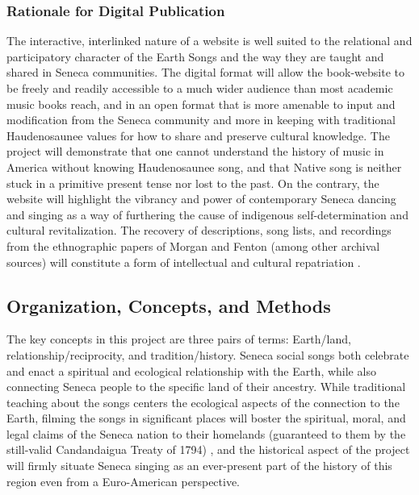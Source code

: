 \documentclass{neh}
\begin{document}
\subsubsection{Rationale for Digital Publication}

The interactive, interlinked nature of a website is well suited to the
relational and participatory character of the Earth Songs and the way they are
taught and shared in Seneca communities.
The digital format will allow the book-website to be freely and readily
accessible to a much wider audience than most academic music books reach, and
in an open format that is more amenable to input and modification from the
Seneca community and more in keeping with traditional Haudenosaunee values for
how to share and preserve cultural knowledge.
The project will demonstrate that one cannot understand the history of music
in America without knowing Haudenosaunee song, and that Native song is neither 
stuck in a primitive present tense nor lost to the past.
On the contrary, the website will highlight the vibrancy and power of
contemporary Seneca dancing and singing as a way of furthering the cause of
indigenous self-determination and cultural revitalization.
The recovery of descriptions, song lists, and recordings from the ethnographic
papers of Morgan and Fenton (among other archival sources) will constitute a
form of intellectual and cultural repatriation
\Autocite{Fox:Repatriation}.

\subsection{Organization, Concepts, and Methods}

The key concepts in this project are three pairs of terms: Earth/land,
relationship/reciprocity, and tradition/history.
Seneca social songs both celebrate and enact a spiritual and ecological
relationship with the Earth, while also connecting Seneca people to the
specific land of their ancestry.
While traditional teaching about the songs centers the ecological aspects of
the connection to the Earth, filming the songs in significant places will
boster the spiritual, moral, and legal claims of the Seneca nation to their
homelands (guaranteed to them by the still-valid Candandaigua Treaty of 1794)
\Autocites{Deloria:BrokenTreaties}{BasicCall}, and the historical aspect of
the project will firmly situate Seneca singing as an ever-present part of the
history of this region even from a Euro-American perspective.
\end{document}

